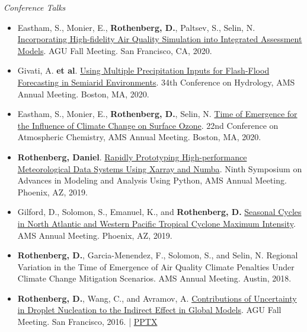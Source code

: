 \documentclass[11pt,letterpaper]{article}
\begin{document}
\bigskip
\emph{Conference Talks}
\medskip
\begin{itemize}[itemindent=-10pt]

 \item Eastham, S., Monier, E., \textbf{Rothenberg, D.}, Paltsev, S., Selin, N. \href{https://agu.confex.com/agu/fm20/meetingapp.cgi/Paper/740077}{Incorporating High-fidelity Air Quality Simulation into Integrated Assessment Models}. AGU Fall Meeting. San Francisco, CA, 2020.

 \item Givati, A. \textbf{et al}. \href{https://ams.confex.com/ams/2020Annual/meetingapp.cgi/Paper/369441}{Using Multiple Precipitation Inputs for Flash-Flood Forecasting in Semiarid Environments}. 34th Conference on Hydrology, AMS Annual Meeting. Boston, MA, 2020.

 \item Eastham, S., Monier, E., \textbf{Rothenberg, D.}, Selin, N. \href{https://ams.confex.com/ams/2020Annual/meetingapp.cgi/Paper/369266}{Time of Emergence for the Influence of Climate Change on Surface Ozone}. 22nd Conference on Atmospheric Chemistry, AMS Annual Meeting. Boston, MA, 2020.

 \item \textbf{Rothenberg, Daniel}. \href{https://ams.confex.com/ams/2019Annual/meetingapp.cgi/Paper/348989}{Rapidly Prototyping High-performance Meteorological Data Systems Using Xarray and Numba}. Ninth Symposium on Advances in Modeling and Analysis Using Python, AMS Annual Meeting. Phoenix, AZ, 2019.

 \item Gilford, D., Solomon, S., Emanuel, K., and \textbf{Rothenberg, D.} \href{https://ams.confex.com/ams/2019Annual/meetingapp.cgi/Paper/349989}{Seasonal Cycles in North Atlantic and Western Pacific Tropical Cyclone Maximum Intensity}. AMS Annual Meeting. Phoenix, AZ, 2019.

 \item \textbf{Rothenberg, D.}, Garcia-Menendez, F., Solomon, S., and Selin, N. Regional Variation in the Time of Emergence of Air Quality Climate Penalties Under Climate Change Mitigation Scenarios. AMS Annual Meeting. Austin, 2018.

 \item \textbf{Rothenberg, D.}, Wang, C., and Avramov, A.
 \href{https://agu.confex.com/agu/fm16/meetingapp.cgi/Paper/193282}{Contributions of Uncertainty in Droplet Nucleation to the Indirect Effect in Global Models}. AGU Fall Meeting. San Francisco, 2016. | \href{https://figshare.com/articles/Contributions_of_Uncertainty_in_Droplet_Nucleation_to_the_Indirect_Effect_in_Global_Models/4503047}{PPTX}


\end{itemize}
\end{document}
